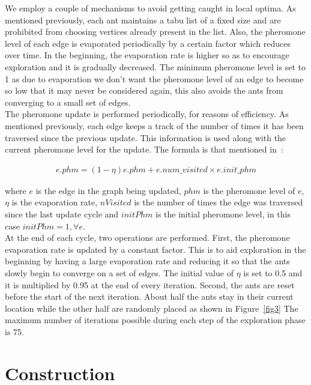 \begin{spacing}{1.5}
\indent We employ a couple of mechanisms to avoid getting caught in local optima. As mentioned previously, each ant maintains a tabu list of a fixed size and are prohibited from choosing vertices already present in the list. Also, the pheromone level of each edge is evaporated periodically by a certain factor which reduces over time. In the beginning, the evaporation rate is higher so as to encourage exploration and it is gradually decreased. The minimum pheromone level is set to 1 as due to evaporation we don't want the pheromone level of an edge to become so low that it may never be considered again, this also avoids the ants from converging to a small set of edges.\\
\indent The pheromone update is performed periodically, for reasons of efficiency. As mentioned previously, each edge keeps a track of the number of times it has been traversed since the previous update. This information is used along with the current pheromone level for the update. The formula is that mentioned in~\cite{5910378}:

\begin{align}
e.phm = (1 - \eta)e.phm + e.num\_visited \times e.init\_phm
\end{align}

where $e$ is the edge in the graph being updated, $phm$ is the pheromone level of $e$, $\eta$ is the evaporation rate, $nVisited$ is the number of times the edge was traversed since the last update cycle and $initPhm$ is the initial pheromone level, in this case $initPhm = 1, \forall e$.\\
\indent At the end of each cycle, two operations are performed. First, the pheromone evaporation rate is updated by a constant factor. This is to aid exploration in the beginning by having a large evaporation rate and reducing it so that the ants slowly begin to converge on a set of edges. The initial value of $\eta$ is set to 0.5 and it is multiplied by 0.95 at the end of every iteration. Second, the ants are reset before the start of the next iteration. About half the ants stay in their current location while the other half are randomly placed as shown in Figure~\ref{fig3} The maximum number of iterations possible during each step of the exploration phase is 75.


\section{Construction}


\end{spacing}
